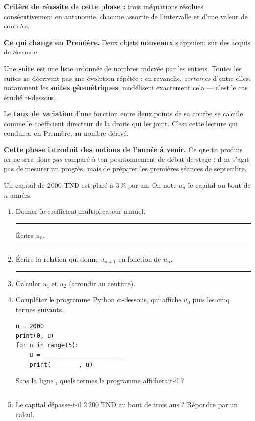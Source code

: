 \documentclass[10pt,a4paper]{article}
\begin{document}
\begin{successbox}\textbf{Critère de réussite de cette phase :} trois inéquations résolues consécutivement en autonomie, chacune assortie de l'intervalle et d'une valeur de contrôle.\end{successbox}
\certline
\needspace{62mm}\par\vspace{3mm}

\begin{methodbox}
\textbf{Ce qui change en Première.} Deux objets \textbf{nouveaux} s'appuient sur des acquis de Seconde.
\par\smallskip
Une \textbf{suite} est une liste ordonnée de nombres indexée par les entiers. Toutes les suites ne décrivent
pas une évolution répétée ; en revanche, \emph{certaines} d'entre elles, notamment les \textbf{suites
géométriques}, modélisent exactement cela — c'est le cas étudié ci-dessous.
\par\smallskip
Le \textbf{taux de variation} d'une fonction entre deux points de sa courbe se calcule comme le coefficient
directeur de la droite qui les joint. C'est cette lecture qui conduira, en Première, au nombre dérivé.
\end{methodbox}
\begin{warningbox}\small
\textbf{Cette phase introduit des notions de l'année à venir.} Ce que tu produis ici ne sera donc
\emph{pas} comparé à ton positionnement de début de stage : il ne s'agit pas de mesurer un progrès,
mais de préparer les premières séances de septembre.
\end{warningbox}


Un capital de $2\,000$ TND est placé à $3\,\%$ par an. On note $u_n$ le capital au bout de $n$ années.
\begin{enumerate}
\item Donner le coefficient multiplicateur annuel. \rule{35mm}{0.32pt} \quad Écrire $u_0$. \rule{28mm}{0.32pt}
\item Écrire la relation qui donne $u_{n+1}$ en fonction de $u_n$. \rule{55mm}{0.32pt}
\item Calculer $u_1$ et $u_2$ (arrondir au centime).
\item Compléter le programme Python ci-dessous, qui affiche $u_0$ puis les cinq termes suivants.
\begin{lstlisting}
u = 2000
print(0, u)
for n in range(5):
    u = _______________________
    print(________, u)
\end{lstlisting}
\par\vspace{0.5mm}
Sans la ligne , quels termes le programme afficherait-il ? \rule{45mm}{0.32pt}
\item Le capital dépasse-t-il $2\,200$ TND au bout de trois ans ? Répondre par un calcul.
\end{enumerate}
\end{document}
